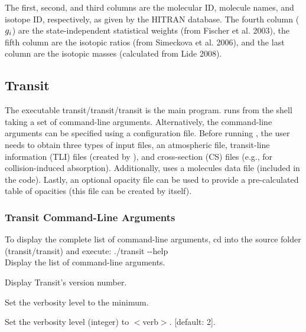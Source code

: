 \documentclass[letterpaper, 12pt]{article}
\begin{document}
The first, second, and third columns are the molecular ID, molecule
names, and isotope ID, respectively, as given by the HITRAN database.
The fourth column ($g\sb{i}$) are the state-independent statistical
weights 
(from Fischer et al. 2003), 
the fifth column are
the isotopic ratios 
(from Simeckova et al. 2006), 
and the
last column are the isotopic masses 
(calculated from Lide 2008).

\subsection{Transit}
\label{sec:input-transit}

The executable {\tttm transit/transit/transit} is the main
{\transit} program.  {\transit} runs from the shell taking a set of
command-line arguments.  Alternatively, the command-line arguments can
be specified using a configuration file.  Before running {\transit},
the user needs to obtain three types of input files, an atmospheric
file, transit-line information (TLI) files (created by {\pylineread}),
and cross-section (CS) files (e.g., for collision-induced absorption).  Additionally,
{\transit} uses a molecules data file (included in the code).  Lastly,
an optional opacity file can be used to provide a pre-calculated table
of opacities (this file can be created by {\transit} itself).

\subsubsection{Transit Command-Line Arguments}
\label{sec:transitCLA}

To display the complete list of command-line arguments, cd into the
{\transit} source folder ({\tttm transit/transit}) and
execute: \newline
{\tttb ./transit {-}{-}help} \\

 \newline
{}
         {Display the list of command-line arguments.}

         {Display Transit's version number.}

         {Set the verbosity level to the minimum.}

         {Set the verbosity level (integer) to $<$verb$>$. [default: 2].}
\end{document}
